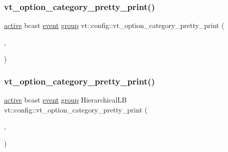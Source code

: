 \mbox{\label{namespacevt_1_1config_a470ab6921666541439eac171c9a64c80}} 
\subsubsection{\texorpdfstring{vt\+\_\+option\+\_\+category\+\_\+pretty\+\_\+print()}{vt\_option\_category\_pretty\_print()}\hspace{0.1cm}{\footnotesize\ttfamily [5/17]}}
{\footnotesize\ttfamily \hyperlink{namespacevt_1_1config_a6bd1d6215bda0d8ca02811798399f689a82f77c67af0c363709010c6df4dbd920}{active} bcast \hyperlink{namespacevt_1_1config_a6bd1d6215bda0d8ca02811798399f689a9e0b3f734ed730f6f3117f0687eda7df}{event} \hyperlink{namespacevt_1_1config_a6bd1d6215bda0d8ca02811798399f689a132506d2b8e888d0a91ae4470d4197c1}{group} vt\+::config\+::vt\+\_\+option\+\_\+category\+\_\+pretty\+\_\+print (\begin{DoxyParamCaption}\item[{\hyperlink{namespacevt_1_1config_a6bd1d6215bda0d8ca02811798399f689a82a0081a94d5c5dfd18b0b3f7eca64b7}{handler}}]{,  }\item[{\char`\"{}handler\char`\"{}}]{ }\end{DoxyParamCaption})}

\mbox{\label{namespacevt_1_1config_a81765eaefe5b70773cc64204d7b54de7}} 
\subsubsection{\texorpdfstring{vt\+\_\+option\+\_\+category\+\_\+pretty\+\_\+print()}{vt\_option\_category\_pretty\_print()}\hspace{0.1cm}{\footnotesize\ttfamily [6/17]}}
{\footnotesize\ttfamily \hyperlink{namespacevt_1_1config_a6bd1d6215bda0d8ca02811798399f689a82f77c67af0c363709010c6df4dbd920}{active} bcast \hyperlink{namespacevt_1_1config_a6bd1d6215bda0d8ca02811798399f689a9e0b3f734ed730f6f3117f0687eda7df}{event} \hyperlink{namespacevt_1_1config_a6bd1d6215bda0d8ca02811798399f689a132506d2b8e888d0a91ae4470d4197c1}{group} Hierarchical\+LB vt\+::config\+::vt\+\_\+option\+\_\+category\+\_\+pretty\+\_\+print (\begin{DoxyParamCaption}\item[{\hyperlink{namespacevt_1_1config_a6bd1d6215bda0d8ca02811798399f689a84814f202af58c104d72bf8c23c0544c}{gossiplb}}]{,  }\item[{\char`\"{}Gossip\+LB\char`\"{}}]{ }\end{DoxyParamCaption})}

